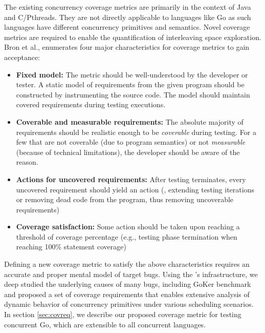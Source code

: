 The existing concurrency coverage metrics are primarily in the context of Java and C/Pthreads.
%
They are not directly applicable to languages like Go as such languages have different concurrency primitives and semantics.
%
Novel coverage metrics are required to enable the quantification of interleaving space exploration.
%
Bron et al.,\cite{bron-appSyncCov-ppopp05} enumerates four major characteristics for coverage metrics to gain acceptance:
\begin{itemize}
  \item \textbf{Fixed model:} The metric should be well-understood by the developer or tester. A static model of requirements from the given program should be constructed by instrumenting the source code. The model should maintain covered requirements during testing executions.
  \item \textbf{Coverable and measurable requirements:} The absolute majority of requirements should be realistic enough to be \textit{coverable} during testing. For a few that are not coverable (due to program semantics) or not \textit{measurable} (because of technical limitations), the developer should be aware of the reason.
  \item \textbf{Actions for uncovered requirements:} After testing terminates, every uncovered requirement should yield an action (\eg, extending testing iterations or removing dead code from the program, thus removing uncoverable requirements)
  \item \textbf{Coverage satisfaction:} Some action should be taken upon reaching a threshold of coverage percentage (e.g., testing phase termination when reaching 100\% statement coverage)
\end{itemize}

Defining a new coverage metric to satisfy the above characteristics requires an accurate and proper mental model of target bugs.
%
Using the \goat's infrastructure, we deep studied the underlying causes of many bugs, including GoKer benchmark~\cite{yuan-gobench-cgo21} and proposed a set of coverage requirements that enables extensive analysis of dynamic behavior of concurrency primitives under various scheduling scenarios.
%
In section \ref{sec:covreq}, we describe our proposed coverage metric for testing concurrent Go, which are extensible to all concurrent languages.
